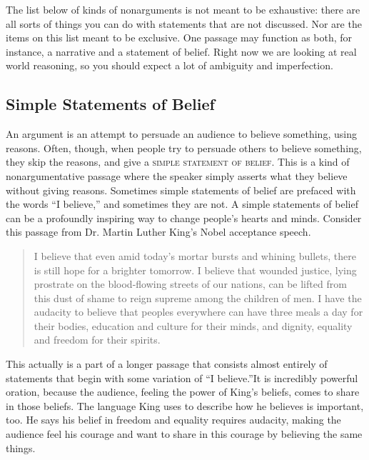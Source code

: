 The list below of kinds of nonarguments is not meant to be exhaustive: there are all sorts of things you can do with statements that are not discussed. Nor are the items on this list meant to be exclusive. One passage may function as both, for instance, a narrative and a statement of belief. Right now we are looking at real world reasoning, so you should expect a lot of ambiguity and imperfection.

\subsection{Simple Statements of Belief}

An argument is an attempt to persuade an audience to believe something, using reasons. Often, though, when people try to persuade others to believe something, they skip the reasons, and give a \textsc{\gls{simple statement of belief}}. \label{def:simple_statement_of_belief} This is a kind of nonargumentative passage where the speaker simply asserts what they believe without giving reasons. Sometimes simple statements of belief are prefaced with the words ``I believe,'' and sometimes they are not. A simple statements of belief can be a profoundly inspiring way to change people's hearts and minds. Consider this passage from Dr. Martin Luther King's Nobel acceptance speech.

\begin{quotation} \noindent I believe that even amid today's mortar bursts and whining bullets, there is still hope for a brighter tomorrow. I believe that wounded justice, lying prostrate on the blood-flowing streets of our nations, can be lifted from this dust of shame to reign supreme among the children of men. I have the audacity to believe that peoples everywhere can have three meals a day for their bodies, education and culture for their minds, and dignity, equality and freedom for their spirits. \cite{King2001} \end{quotation}

This actually is a part of a longer passage that consists almost entirely of statements that begin with some variation of ``I believe.''It is incredibly powerful oration, because the audience, feeling the power of King's beliefs, comes to share in those beliefs. The language King uses to describe how he believes is important, too. He says his belief in freedom and equality requires audacity, making the audience feel his courage and want to share in this courage by believing the same things.

